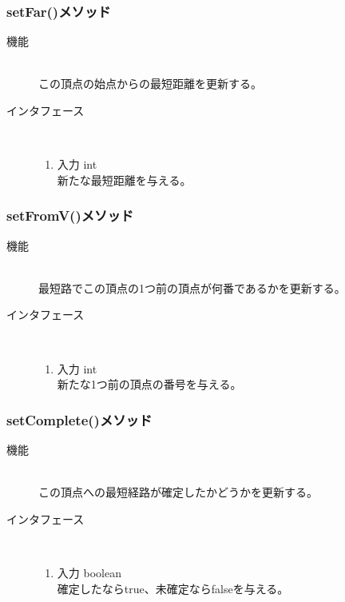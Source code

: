 \documentclass[a4j]{jarticle}
\begin{document}
\begin{description}
\begin{description}
\subsubsection{setFar()メソッド}

\begin{description}
\item[機能]\mbox{}\\
この頂点の始点からの最短距離を更新する。
\item[インタフェース]\
  \begin{enumerate}
  \item 入力 int\mbox{}\\
    新たな最短距離を与える。
  \end{enumerate}
\end{description}

\subsubsection{setFromV()メソッド}

\begin{description}
\item[機能]\mbox{}\\
最短路でこの頂点の1つ前の頂点が何番であるかを更新する。
\item[インタフェース]\
  \begin{enumerate}
  \item 入力 int\mbox{}\\
    新たな1つ前の頂点の番号を与える。
  \end{enumerate}
\end{description}


\subsubsection{setComplete()メソッド}

\begin{description}
\item[機能]\mbox{}\\
この頂点への最短経路が確定したかどうかを更新する。
\item[インタフェース]\
  \begin{enumerate}
  \item 入力 boolean\mbox{}\\
    確定したならtrue、未確定ならfalseを与える。
  \end{enumerate}
\end{description}


\end{description}
\end{description}
\end{document}
